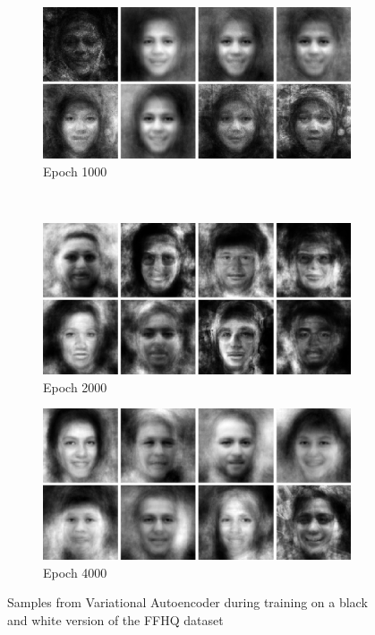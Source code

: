 \begin{figure}[h!]
    \begin{subfigure}[b]{0.45\textwidth}
         \includegraphics[width=\textwidth]{fig/vae/ffhq_epoch1000}
        \caption{Epoch 1000}
    \end{subfigure}
    ~
    \begin{subfigure}[b]{0.45\textwidth}
         \includegraphics[width=\textwidth]{fig/vae/ffhq_epoch2000}
        \caption{Epoch 2000}
    \end{subfigure}

    \begin{subfigure}[b]{\textwidth}
         \includegraphics[width=\textwidth]{fig/vae/ffhq_epoch4000}
        \caption{Epoch 4000}
    \end{subfigure}
    \caption{Samples from Variational Autoencoder  during training on a black and white version of  the FFHQ dataset}
    \label{vaq-bwffhq-samples}
\end{figure}

